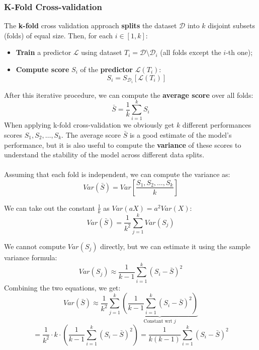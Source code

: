\subsubsection{K-Fold Cross-validation}
The \textbf{k-fold} cross validation approach \textbf{splits} the dataset $\mathcal{D}$ into $k$ disjoint subsets (folds) of equal size.
Then, for each $i \in [1, k]$:
\begin{itemize}
	\item \textbf{Train} a predictor $\mathcal{L}$ using dataset $T_i = \mathcal{D} \setminus \mathcal{D}_i$ (all folds except the $i$-th one);
	\item \textbf{Compute score} $S_i$ of the \textbf{predictor} $\mathcal{L}(T_i)$:
	\[S_i = S_{\mathcal{D}_i}[\mathcal{L}(T_i)]\]
\end{itemize}
After this iterative procedure, we can compute the \textbf{average score} over all folds:
\[\bar{S} = \frac{1}{k} \sum_{i=1}^{k} S_i\]
When applying k-fold cross-validation we obviously get $k$ different performances scores $S_1, S_2, \dots, S_k$.
The average score $\bar{S}$ is a good estimate of the model's performance, but it is also useful to compute the 
\textbf{variance} of these scores to understand the stability of the model across different data splits.
\\\\Assuming that each fold is independent, we can compute the variance as:
\[\mathit{Var}(\bar{S}) = \mathit{Var}[\frac{S_1, S_2, \dots, S_k}{k}]\]

We can take out the constant $\frac{1}{k}$ as $\mathit{Var}(aX) = a^2 \mathit{Var}(X)$:
\[\mathit{Var}(\bar{S}) = \frac{1}{k^2} \sum_{j = 1}^{k} \mathit{Var}(S_j)\]

We cannot compute $\mathit{Var}(S_j)$ directly, but we can estimate it using the sample variance formula:
\[\mathit{Var}(S_j) \approx \frac{1}{k-1} \sum_{i=1}^{k} (S_i - \bar{S})^2\]
Combining the two equations, we get:
\[\mathit{Var}(\bar{S}) \approx \frac{1}{k^2} \sum_{j=1}^{k} \underbrace{\left(\frac{1}{k-1} \sum_{i=1}^{k} (S_i - \bar{S})^2\right)}_{\text{Constant wrt } j}\]
\[ = \frac{1}{k^2} \cdot k \cdot \left(\frac{1}{k-1} \sum_{i=1}^{k} (S_i - \bar{S})^2\right) = \frac{1}{k(k-1)} \sum_{i=1}^{k} (S_i - \bar{S})^2\]

